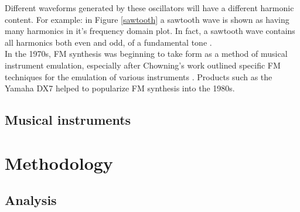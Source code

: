 \documentclass{article}
\begin{document}
        Different waveforms generated by these oscillators will have a different harmonic content.
        For example: in Figure \ref{sawtooth} a sawtooth wave is shown as having many harmonics in it's frequency domain plot.
        In fact, a sawtooth wave contains all harmonics both even and odd, of a fundamental tone \cite{roederer1995physics}.
        \\
        In the 1970s, FM synthesis was beginning to take form as a method of musical instrument emulation, especially after Chowning's work outlined specific FM techniques for the emulation of various instruments \cite{chowning1973synthesis}.
        Products such as the Yamaha DX7 helped to popularize FM synthesis into the 1980s.
        
    \subsection{Musical instruments}

\section{Methodology}
    \subsection{Analysis}
\end{document}
